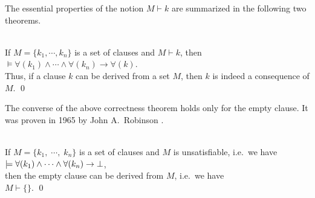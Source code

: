 The essential properties of the notion $M \vdash k$ are summarized in the following two theorems.

\begin{Satz}  \hspace*{\fill} \\
    If $M = \{k_1,\cdots,k_n\}$ is a set of clauses and $M \vdash k$, then \\[0.2cm]
    \hspace*{1.3cm} $\models \forall(k_1) \wedge \cdots \wedge \forall(k_n) \rightarrow \forall(k)$. \\[0.2cm]
    Thus, if a clause $k$ can be derived from a set $M$, 
    then $k$ is indeed a consequence of $M$. \qed
\end{Satz}

\noindent
The converse of the above correctness theorem holds only for the empty clause. It was proven in 1965 by John
A.~Robinson \cite{robinson:1965}. 
\begin{Satz}
   \hspace*{\fill} \\
  If $M = \{k_1,\;\cdots,\; k_n\}$ is a set of clauses and $M$ is unsatisfiable, i.e.~we have
  \\[0.2cm]
  \hspace*{1.3cm}
  $\models \forall(k_1) \wedge \cdots \wedge \forall(k_n) \rightarrow \bot$, 
  \\[0.2cm]
  then the empty clause can be derived from $M$, i.e.~we have
  \\[0.2cm]
  \hspace*{1.3cm} $M \vdash \{\}$.     \qed
\end{Satz}

